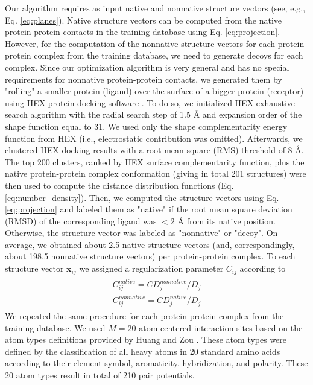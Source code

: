 Our algorithm requires as input native and nonnative structure vectors (see, e.g., Eq. \ref{eq:planes}). Native structure vectors can be computed from the native 
protein-protein contacts in the training database using Eq. \ref{eq:projection}. 
However, for the computation of the nonnative structure vectors for each protein-protein complex from the training database, we need to generate decoys for each complex.
Since our optimization algorithm is very general and has no special requirements for nonnative protein-protein contacts, we generated them by "rolling" a 
smaller protein (ligand) over the surface of a bigger protein (receptor) using  HEX protein docking software \cite{Ritchie2000, hex}. 
To do so, we initialized HEX exhaustive search algorithm with the radial search step of 1.5 {\AA} and expansion order of the shape function equal to 31. We used only the 
shape complementarity energy function from HEX (i.e., electrostatic contribution was omitted). Afterwards, we clustered HEX docking results with a root mean square (RMS) 
threshold  of 8 {\AA}. The top 200 clusters, ranked by HEX surface complementarity function, plus the native protein-protein complex conformation 
(giving in total 201 structures) were then used to compute the distance distribution functions (Eq. \ref{eq:number_density}). 
Then, we computed the structure vectors using Eq. \ref{eq:projection} and labeled them as "native" if the root mean square deviation (RMSD) of the corresponding 
ligand was $<2$ {\AA} from its native position. Otherwise, the structure vector was labeled as "nonnative" or "decoy". 
On average, we obtained about 2.5 native structure vectors (and, correspondingly, about  198.5 nonnative structure vectors) per protein-protein complex.
To each structure vector $ \mathbf{x}_{ij}$ we assigned a regularization parameter $C_{ij}$ according to 
\begin{eqnarray}
\label{eq:regularizationParameter}
\begin{split}
C_{ij}^{native} = C{D_j^{nonnative}}/{D_j} \\
C_{ij}^{nonnative} = C{D_j^{native}}/{D_j}
\end{split}
\end{eqnarray}
%
We repeated the same procedure for each protein-protein complex from the training database.
We used $M=20$ atom-centered  interaction sites based on the atom types definitions provided by Huang and Zou \cite{Huang2008}. These atom types were defined by 
the classification of all heavy atoms in 20 standard amino acids according to their element symbol, aromaticity, hybridization, and polarity. 
These 20 atom types result in total of 210 pair potentials.


